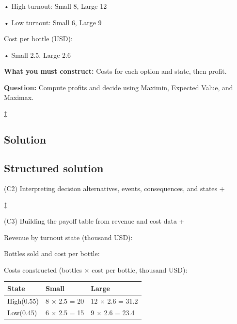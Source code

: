 \documentclass[11pt]{article}
\begin{document}
	• High turnout: Small 8, Large 12
	
	
	
	• Low turnout: Small 6, Large 9
	
	
	
	
	
	Cost per bottle (USD):
	
	
	
	• Small 2.5, Large 2.6
	
	
	
	
	
	
	\textbf{What you must construct:} Costs for each option and state, then profit.
	
	
	
	
	
	
	\textbf{Question:} Compute profits and decide using Maximin, Expected Value, and Maximax.
	
	\hyperref[problem3a-criteria]{↑}
	
	\subsection*{Solution}
	
	\label{problem3a-solution}\label{problem3a-criteria}
	
	\subsection*{Structured solution}
	
	
	
	
	
	(C2) Interpreting decision alternatives, events, consequences, and states
	+
	
	
	
	
	
	\hyperref[problem3a-criteria]{↑}
	
	
	
	
	(C3) Building the payoff table from revenue and cost data
	+
	
	
	Revenue by turnout state (thousand USD):
	
	Bottles sold and cost per bottle:
	
	Costs constructed (bottles × cost per bottle, thousand USD):
	\begin{center}
		\begin{tabular}{lll}
			\toprule
			State & Small & Large \\
			\midrule
			High\newline (0.55) & 8 × 2.5 = 20 & 12 × 2.6 = 31.2 \\
			Low\newline (0.45) & 6 × 2.5 = 15 & 9 × 2.6 = 23.4 \\
			\bottomrule
		\end{tabular}
	\end{center}
	
\end{document}
